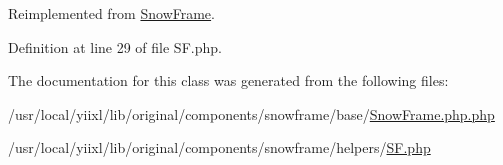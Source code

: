 Reimplemented from \hyperlink{classSnowFrame_a971fec4a94c055f1e9cfbb6108b186a8}{SnowFrame}.



Definition at line 29 of file SF.php.



The documentation for this class was generated from the following files:\begin{DoxyCompactItemize}
\item 
/usr/local/yiixl/lib/original/components/snowframe/base/\hyperlink{SnowFrame_8php_8php}{SnowFrame.php.php}\item 
/usr/local/yiixl/lib/original/components/snowframe/helpers/\hyperlink{SF_8php}{SF.php}\end{DoxyCompactItemize}
